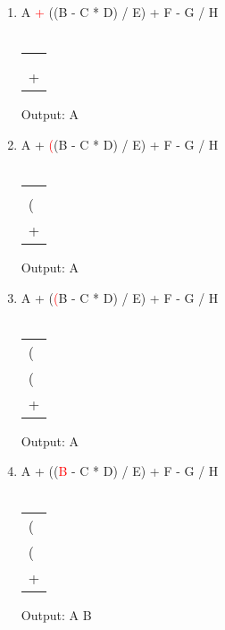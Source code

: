 \documentclass[a4paper]{article}
\begin{document}
\begin{large}
\begin{enumerate}
    \item
          A \textcolor{red}{+} ((B - C * D) / E) + F - G / H\\
          \\ \begin{tabular}[t]{ | p{1em} | }
            \\ \hline
            \\ \hline
            \\ \hline
            \\ \hline
            + \\
            \hline
          \end{tabular}
          \hspace{2em}
          Output: A
    \item
          A + \textcolor{red}{(}(B - C * D) / E) + F - G / H\\
          \\
          \begin{tabular}[t]{ | p{1em} | }
            \\ \hline
            \\ \hline
            \\ \hline
            ( \\ \hline
            + \\ \hline
          \end{tabular}
          \hspace{2em}
          Output: A
    \item
          A + (\textcolor{red}{(}B - C * D) / E) + F - G / H\\
          \\
          \begin{tabular}[t]{ | p{1em} | }
            \\ \hline
            \\ \hline
            ( \\ \hline
            ( \\ \hline
            + \\ \hline
          \end{tabular}
          \hspace{2em}
          Output: A
    \item
          A + ((\textcolor{red}{B} - C * D) / E) + F - G / H\\
          \\
          \begin{tabular}[t]{ | p{1em} | }
            \\ \hline
            \\ \hline
            ( \\ \hline
            ( \\
            \hline
            + \\ \hline
          \end{tabular}
          \hspace{2em}
          Output: A B


\end{enumerate}
\end{large}
\end{document}
